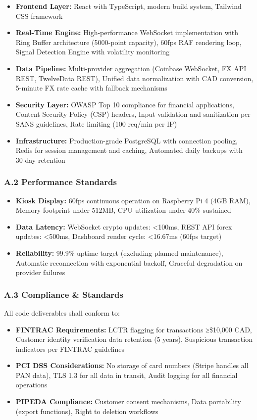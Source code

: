 \documentclass[11pt, a4paper]{article}
\begin{document}
\begin{itemize}[leftmargin=*]
\item \textbf{Frontend Layer:} React with TypeScript, modern build system, Tailwind CSS framework
\item \textbf{Real-Time Engine:} High-performance WebSocket implementation with Ring Buffer architecture (5000-point capacity), 60fps RAF rendering loop, Signal Detection Engine with volatility monitoring
\item \textbf{Data Pipeline:} Multi-provider aggregation (Coinbase WebSocket, FX API REST, TwelveData REST), Unified data normalization with CAD conversion, 5-minute FX rate cache with fallback mechanisms
\item \textbf{Security Layer:} OWASP Top 10 compliance for financial applications, Content Security Policy (CSP) headers, Input validation and sanitization per SANS guidelines, Rate limiting (100 req/min per IP)
\item \textbf{Infrastructure:} Production-grade PostgreSQL with connection pooling, Redis for session management and caching, Automated daily backups with 30-day retention
\end{itemize}

\subsubsection*{A.2 Performance Standards}
\begin{itemize}[leftmargin=*]
\item \textbf{Kiosk Display:} 60fps continuous operation on Raspberry Pi 4 (4GB RAM), Memory footprint under 512MB, CPU utilization under 40\% sustained
\item \textbf{Data Latency:} WebSocket crypto updates: <100ms, REST API forex updates: <500ms, Dashboard render cycle: <16.67ms (60fps target)
\item \textbf{Reliability:} 99.9\% uptime target (excluding planned maintenance), Automatic reconnection with exponential backoff, Graceful degradation on provider failures
\end{itemize}

\subsubsection*{A.3 Compliance \& Standards}
All code deliverables shall conform to:
\begin{itemize}[leftmargin=*]
\item \textbf{FINTRAC Requirements:} LCTR flagging for transactions ≥\$10,000 CAD, Customer identity verification data retention (5 years), Suspicious transaction indicators per FINTRAC guidelines
\item \textbf{PCI DSS Considerations:} No storage of card numbers (Stripe handles all PAN data), TLS 1.3 for all data in transit, Audit logging for all financial operations
\item \textbf{PIPEDA Compliance:} Customer consent mechanisms, Data portability (export functions), Right to deletion workflows
\end{itemize}
\end{document}
